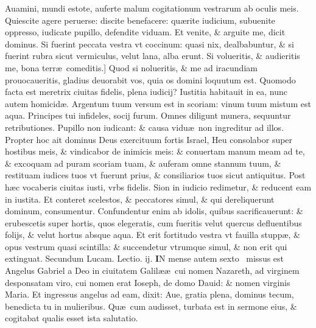 \documentclass[a5paper,10pt]{book}
\def\ae{æ}
\begin{document}
\begin{multicols*}{2}
\vspace{-1em}
\textdagger Auamini, mundi estote, auferte malum cogitationum vestrarum ab oculis meis.
Quiescite agere peruerse: discite benefacere: qu\ae rite iudicium, subuenite oppresso, iudicate pupillo, defendite viduam.
Et venite, \& arguite me, dicit dominus.
Si fuerint peccata vestra vt coccinum: quasi nix, dealbabuntur, \& si fuerint rubra sicut vermiculus, velut lana, alba erunt.
Si volueritis, \& audieritis me, bona terr\ae \ comeditis.]
Quod si nolueritis, \& me ad iracundiam prouocaueritis, gladius deuorabit vos, quia os domini loquutum est.
Quomodo facta est meretrix ciuitas fidelis, plena iudicij?
Iustitia habitauit in ea, nunc autem homicid\ae .
Argentum tuum versum est in scoriam: vinum tuum mistum est aqua.
Principes tui infideles, socij furum.
Omnes diligunt munera, sequuntur retributiones.
Pupillo non iudicant: \& causa vidu\ae \ non ingreditur ad illos.
Propter hoc ait dominus Deus exercituum fortis Israel, Heu consolabor super hostibus meis, \& vindicabor de inimicis meis: \& conuertam manum meam ad te, \& excoquam ad puram scoriam tuam, \& auferam omne stannum tuum, \& restituam iudices tuos vt fuerunt prius, \& consiliarios tuos sicut antiquitus.
Post h\ae c vocaberis ciuitas iusti, vrbs fidelis.
Sion in iudicio redimetur, \& reducent eam in iustita.
Et conteret scelestos, \& peccatores simul, \& qui dereliquerunt dominum, consumentur.
Confundentur enim ab idolis, quibus sacrificauerunt: \& erubescetis super hortis, quos elegeratis, cum fueritis velut quercus defluentibus folijs, \& velut hortus absque aqua.
Et erit fortitudo vestra vt fauilla stupp\ae , \& opus vestrum quasi scintilla: \& succendetur vtrumque simul, \& non erit qui extinguat.
\newline \color{red} Secundum Lucam. \hfill Lectio. ij.\color{black}
\vspace{-.25em}
\lettrine[lines=2]{\bfseries \color{red} I}{}N mense autem sexto \textdagger \ missus est Angelus Gabriel a Deo in ciuitatem Galil\ae \ae \ cui nomen Nazareth, ad virginem desponsatam viro, cui nomen erat Ioseph, de domo Dauid: \& nomen virginis Maria.
Et ingressus angelus ad eam, dixit: Aue, gratia plena, dominus tecum, benedicta tu in mulieribus.
Qu\ae \ cum audisset, 
turbata est in sermone eius, \& cogitabat qualis esset ista salutatio.

\end{multicols*}
\end{document}
